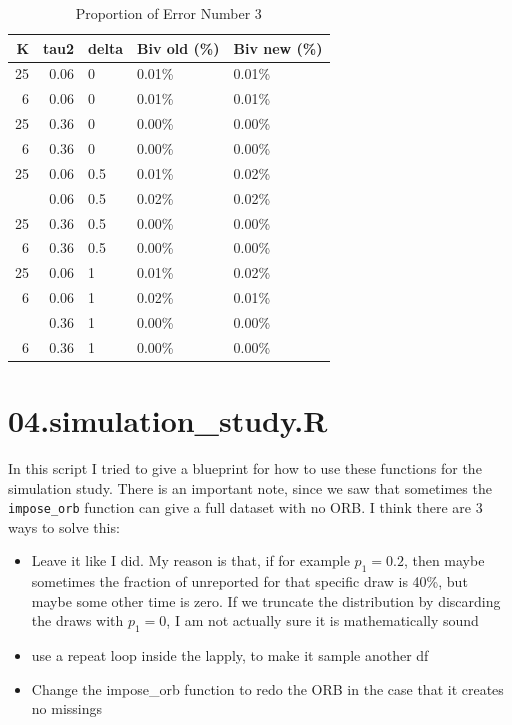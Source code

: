 \documentclass{article}\usepackage[]{graphicx}\usepackage[]{xcolor}
\begin{document}
\begin{table}

\caption{\label{tab:fail.rate.table}Proportion of Error Number 3}
\centering
\begin{tabular}[t]{rrlll}
\toprule
K & tau2 & delta & Biv old (\%) & Biv new (\%)\\
\midrule
25 & 0.06 & 0 & 0.01\% & 0.01\%\\
6 & 0.06 & 0 & 0.01\% & 0.01\%\\
25 & 0.36 & 0 & 0.00\% & 0.00\%\\
6 & 0.36 & 0 & 0.00\% & 0.00\%\\
25 & 0.06 & 0.5 & 0.01\% & 0.02\%\\
\addlinespace
6 & 0.06 & 0.5 & 0.02\% & 0.02\%\\
25 & 0.36 & 0.5 & 0.00\% & 0.00\%\\
6 & 0.36 & 0.5 & 0.00\% & 0.00\%\\
25 & 0.06 & 1 & 0.01\% & 0.02\%\\
6 & 0.06 & 1 & 0.02\% & 0.01\%\\
\addlinespace
25 & 0.36 & 1 & 0.00\% & 0.00\%\\
6 & 0.36 & 1 & 0.00\% & 0.00\%\\
\bottomrule
\end{tabular}
\end{table}



\FloatBarrier
\section{04.simulation\_study.R}
In this script I tried to give a blueprint for how to use these functions for the simulation study.
There is an important note, since we saw that sometimes the \texttt{impose\_orb} function can give a full dataset with no ORB.
I think there are 3 ways to solve this: 
\begin{itemize}
	\item Leave it like I did. My reason is that, if for example $p_1 = 0.2$, then maybe sometimes the fraction
	of unreported for that specific draw is 40\%, but maybe some other time is zero. If we truncate the distribution by discarding the draws with $p_1 = 0$, I am not 
	actually sure it is mathematically sound
	\item use a repeat loop inside the lapply, to make it sample another df 
	\item Change the impose\_orb function to redo the ORB in the case that it creates no missings
\end{itemize}
\end{document}
